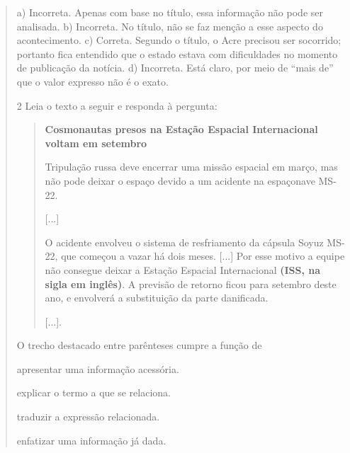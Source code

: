 \begin{quote}
{a) Incorreta. Apenas com base no título, essa informação não pode ser analisada.
b) Incorreta. No título, não se faz menção a esse aspecto do acontecimento.
c) Correta. Segundo o título, o Acre precisou ser socorrido; portanto fica entendido que o estado estava com dificuldades no momento de publicação da notícia.
d) Incorreta. Está claro, por meio de ``mais de'' que o valor expresso não é o exato.}

\num{2} Leia o texto a seguir e responda à pergunta:

\begin{quote}
\textbf{Cosmonautas presos na Estação Espacial Internacional voltam em
setembro}

Tripulação russa deve encerrar uma missão espacial em março, mas não
pode deixar o espaço devido a um acidente na espaçonave MS-22.

{[}...{]}

O acidente envolveu o sistema de resfriamento da cápsula Soyuz MS-22,
que começou a vazar há dois meses. {[}...{]} Por esse motivo a equipe
não consegue deixar a Estação Espacial Internacional \textbf{(ISS, na
sigla em inglês)}. A previsão de retorno ficou para setembro deste ano,
e envolverá a substituição da parte danificada.

{[}...{]}.

\end{quote}

O trecho destacado entre parênteses cumpre a função de

\begin{escolha}
\item apresentar uma informação acessória.

\item explicar o termo a que se relaciona.

\item traduzir a expressão relacionada.

\item enfatizar uma informação já dada.
\end{escolha}

\end{quote}
